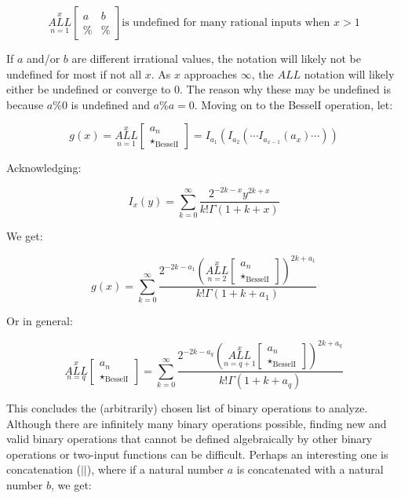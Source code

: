\documentclass{article}
\begin{document}
$$ \underset{n=1}{\overset{x}{ALL}} \begin{bmatrix}
a & b  \\
\% & \%
\end{bmatrix} \text{is undefined for many rational inputs when }x > 1$$

If $a$ and/or $b$ are different irrational values, the notation will likely not be undefined for most if not all $x$. As $x$ approaches $\infty$, the $ALL$ notation will likely either be undefined or converge to 0. The reason why these may be undefined is because $a\%0$ is undefined and $a\%a=0$. Moving on to the BesselI operation, let:

$$g(x) = \underset{n=1}{\overset{x}{ALL}} \begin{bmatrix}
a_n \\
\star_{\text{BesselI}}
\end{bmatrix}=I_{a_1}(I_{a_2}(\cdots I_{a_{x-1}}(a_x) \cdots))$$

Acknowledging:

$$I_x(y) = \underset{k=0}{\overset{\infty}{\sum}} \frac{2^{-2k-x}y^{2k+x}}{k! \Gamma(1+k+x)}$$

We get:

$$g(x)=\underset{k=0}{\overset{\infty}{\sum}} \frac{2^{-2k-a_1}(\underset{n=2}{\overset{x}{ALL}} \begin{bmatrix}
a_n \\
\star_{\text{BesselI}}
\end{bmatrix})^{2k+a_1}}{k! \Gamma(1+k+a_1)}$$

Or in general:

$$\underset{n=q}{\overset{x}{ALL}} \begin{bmatrix}
a_n \\
\star_{\text{BesselI}}
\end{bmatrix}=\underset{k=0}{\overset{\infty}{\sum}} \frac{2^{-2k-a_q}(\underset{n=q+1}{\overset{x}{ALL}} \begin{bmatrix}
a_n \\
\star_{\text{BesselI}}
\end{bmatrix})^{2k+a_q}}{k! \Gamma(1+k+a_q)}$$

This concludes the (arbitrarily) chosen list of binary operations to analyze. Although there are infinitely many binary operations possible, finding new and valid binary operations that cannot be defined algebraically by other binary operations or two-input functions can be difficult. Perhaps an interesting one is concatenation ($||$), where if a natural number $a$ is concatenated with a natural number $b$, we get:
\end{document}
